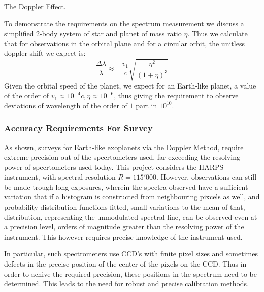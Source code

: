 \documentclass[12pt]{article}
\newenvironment{aside}
  {\begin{mdframed}[style=0,%
      leftline=false,rightline=false,leftmargin=2em,rightmargin=2em,%
          innerleftmargin=0pt,innerrightmargin=0pt,linewidth=0.75pt,%
      skipabove=7pt,skipbelow=7pt]\small}
  {\end{mdframed}}
\begin{document}
        \begin{aside}
            The Doppler Effect. 
            
            To demonstrate the requirements on the spectrum 
            measurement we discuss a simplified 2-body system of star and planet of 
            mass ratio $\eta$. Thus we calculate that for observations in the orbital
            plane and for a circular orbit, the unitless doppler shift we expect is:
            \begin{equation}
                \frac{\Delta\lambda}{\lambda} \approx -\frac{v_1}{c}\sqrt{\frac{\eta^2}{(1+\eta)^3}}
            \end{equation}
            Given the orbital speed of the planet, we expect for an Earth-like planet, a value
            of the order of $v_1 \approx 10^{-4}c, \eta \approx 10^{-6}$, thus giving
            the requirement to observe deviations of wavelength of the order of $1$ part in $10^{10}$.
        \end{aside}

    \subsubsection*{Accuracy Requirements For Survey}
        As shown, surveys for Earth-like exoplanets via the Doppler Method, require extreme 
        precision out of the specrtometers used, far exceeding the resolving power of specrtometers
        used today. This project considers the HARPS instrument, with spectral resolution $R = 115'000$.
        However, observations can still be made trough long exposures, wherein the spectra observed
        have a sufficient variation that if a histogram is constructed from neighbouring pixcels as well,
        and probability distribution functions fitted, small variations to the mean of that,
         distribution,
        representing the unmodulated spectral line, can be observed even at a precision level, orders of
        magnitude greater than the resolving power of the instrument. This however requires precise knowledge 
        of the instrument used.

        In particular, such spectrometers use CCD's with finite pixel sizes and sometimes defects in 
        the precise position of the center of the pixels on the CCD. Thus in order to achive the required
        precision, these positions in the spectrum need to be determined. This leads to the need 
        for robust and precise calibration methods.
\end{document}
